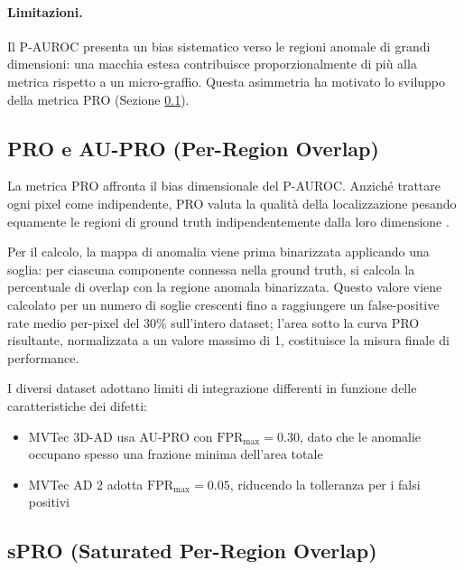 \paragraph{Limitazioni.}
Il P-AUROC presenta un bias sistematico verso le regioni anomale di grandi dimensioni: una macchia estesa contribuisce proporzionalmente di più alla metrica rispetto a un micro-graffio. Questa asimmetria ha motivato lo sviluppo della metrica PRO (Sezione \ref{subsec:pro}).



\subsection{PRO e AU-PRO (Per-Region Overlap)}
\label{subsec:pro}


La metrica PRO \cite{bergmann2019mvtec, bergmann2020uninformed} affronta il bias dimensionale del P-AUROC. Anziché trattare ogni pixel come indipendente, PRO valuta la qualità della localizzazione pesando equamente le regioni di ground truth indipendentemente dalla loro dimensione \cite{bergmann2020uninformed}.

Per il calcolo, la mappa di anomalia viene prima binarizzata applicando una soglia: per ciascuna componente connessa nella ground truth, si calcola la percentuale di overlap con la regione anomala binarizzata. Questo valore viene calcolato per un numero di soglie crescenti fino a raggiungere un false-positive rate medio per-pixel del 30\% sull'intero dataset; l'area sotto la curva PRO risultante, normalizzata a un valore massimo di 1, costituisce la misura finale di performance.


I diversi dataset adottano limiti di integrazione differenti in funzione delle caratteristiche dei difetti:
\begin{itemize}
  \item MVTec 3D-AD usa AU-PRO con $\mathrm{FPR}_{\max}=0.30$, dato che le anomalie occupano spesso una frazione minima dell'area totale
  \item MVTec AD 2 adotta $\mathrm{FPR}_{\max}=0.05$, riducendo la tolleranza per i falsi positivi
\end{itemize}

\subsection{sPRO (Saturated Per-Region Overlap)}
\label{subsec:spro}

